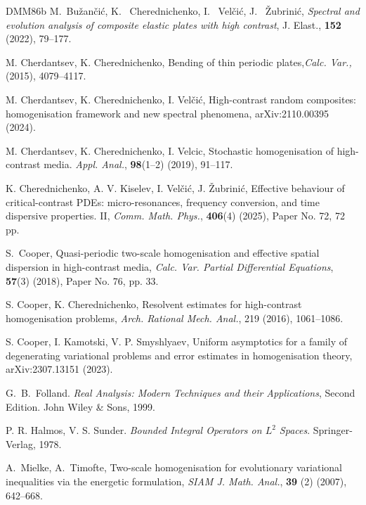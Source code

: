 \documentclass[11pt]{article}
\theoremstyle{remark}
\begin{document}
\begin{thebibliography}{DMM86b}
  M.~Bu\v{z}an\v{c}i\'{c}, K.~ Cherednichenko,  I.~ Vel\v{c}i\'{c}, J.~ \v{Z}ubrini\'{c},
{\it Spectral and evolution analysis of composite elastic plates with high contrast}, J. Elast., {\bf 152} (2022),   79--177.

	
		M. Cherdantsev, K. Cherednichenko,
			\newblock  Bending of thin periodic plates,{\em Calc. Var.,}
		 (2015), 4079--4117.

M. Cherdantsev, K. Cherednichenko, I. Vel\v{c}i\'{c},
\newblock  High-contrast random composites: homogenisation framework and new spectral phenomena,
\newblock   arXiv:2110.00395 (2024).



M. Cherdantsev, K. Cherednichenko, I. Velcic,  Stochastic homogenisation of high-contrast media. {\it Appl. Anal.},
{\bf 98}(1--2) (2019),  91--117.

K. Cherednichenko, A. V.  Kiselev, I. Vel\v{c}i\'{c}, J. \v{Z}ubrini\'{c},
\newblock
	Effective behaviour of critical-contrast PDEs: micro-resonances, frequency conversion, and time dispersive properties. II,
{\em Comm. Math. Phys.}, {\bf 406}(4) (2025),  Paper No. 72, 72 pp.





S.~Cooper,
Quasi-periodic two-scale homogenisation and effective spatial dispersion in high-contrast media,
{\it Calc. Var. Partial Differential Equations}, {\bf 57}(3) (2018), Paper No. 76, pp. 33.

S. Cooper, K. Cherednichenko, \newblock Resolvent estimates for high-contrast homogenisation problems, {\em Arch. Rational Mech. Anal.}, 219 (2016), 1061--1086.

	 S. Cooper, I. Kamotski, V. P. Smyshlyaev,
Uniform asymptotics for a family of degenerating variational problems and error estimates in homogenisation theory,  arXiv:2307.13151 (2023).

G.~B.~Folland. {\it Real Analysis: Modern Techniques and their Applications}, Second Edition. John Wiley \& Sons, 1999.

 P. R. Halmos, V. S. Sunder. {\it Bounded Integral Operators on $L^2$ Spaces}. Springer-Verlag, 1978.

 A.~Mielke, A.~Timofte,
Two-scale homogenisation for evolutionary variational inequalities via the energetic formulation,
{\it SIAM J. Math. Anal.}, {\bf 39} (2) (2007), 642--668.




\end{thebibliography}
\end{document}

